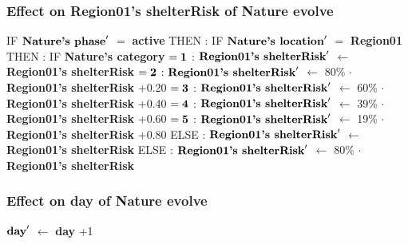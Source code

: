 \documentclass{article}%
\begin{document}
\subsubsection{Effect on Region01's shelterRisk of Nature evolve}%
\label{ssubsec:Effect on Region01's shelterRisk of Nature evolve}%
\begin{flushleft}%
IF %
$\mbox{\textbf{Nature's phase}} '$%
$=$%
\textbf{active}%
\linebreak%
\hspace*{2em}%
THEN %
: %
IF %
$\mbox{\textbf{Nature's location}} '$%
$=$%
\textbf{Region01}%
\linebreak%
\hspace*{4em}%
THEN %
: %
IF %
\textbf{Nature's category}%
\linebreak%
\hspace*{6em}%
$= \mbox{\textbf{1}}$%
: %
$\mbox{\textbf{Region01's shelterRisk}} '$%
$\leftarrow$%
\textbf{Region01's shelterRisk}%
\linebreak%
\hspace*{6em}%
$= \mbox{\textbf{2}}$%
: %
$\mbox{\textbf{Region01's shelterRisk}} '$%
$\leftarrow$%
80\%%
$\cdot$%
\textbf{Region01's shelterRisk}%
+0.20%
\linebreak%
\hspace*{6em}%
$= \mbox{\textbf{3}}$%
: %
$\mbox{\textbf{Region01's shelterRisk}} '$%
$\leftarrow$%
60\%%
$\cdot$%
\textbf{Region01's shelterRisk}%
+0.40%
\linebreak%
\hspace*{6em}%
$= \mbox{\textbf{4}}$%
: %
$\mbox{\textbf{Region01's shelterRisk}} '$%
$\leftarrow$%
39\%%
$\cdot$%
\textbf{Region01's shelterRisk}%
+0.60%
\linebreak%
\hspace*{6em}%
$= \mbox{\textbf{5}}$%
: %
$\mbox{\textbf{Region01's shelterRisk}} '$%
$\leftarrow$%
19\%%
$\cdot$%
\textbf{Region01's shelterRisk}%
+0.80%
\linebreak%
\hspace*{4em}%
ELSE %
: %
$\mbox{\textbf{Region01's shelterRisk}} '$%
$\leftarrow$%
\textbf{Region01's shelterRisk}%
\linebreak%
\hspace*{2em}%
ELSE %
: %
$\mbox{\textbf{Region01's shelterRisk}} '$%
$\leftarrow$%
80\%%
$\cdot$%
\textbf{Region01's shelterRisk}%
\end{flushleft}

%
\subsubsection{Effect on day of Nature evolve}%
\label{ssubsec:Effect on day of Nature evolve}%
\begin{flushleft}%
$\mbox{\textbf{day}} '$%
$\leftarrow$%
\textbf{day}%
+1%
\end{flushleft}
\end{document}
